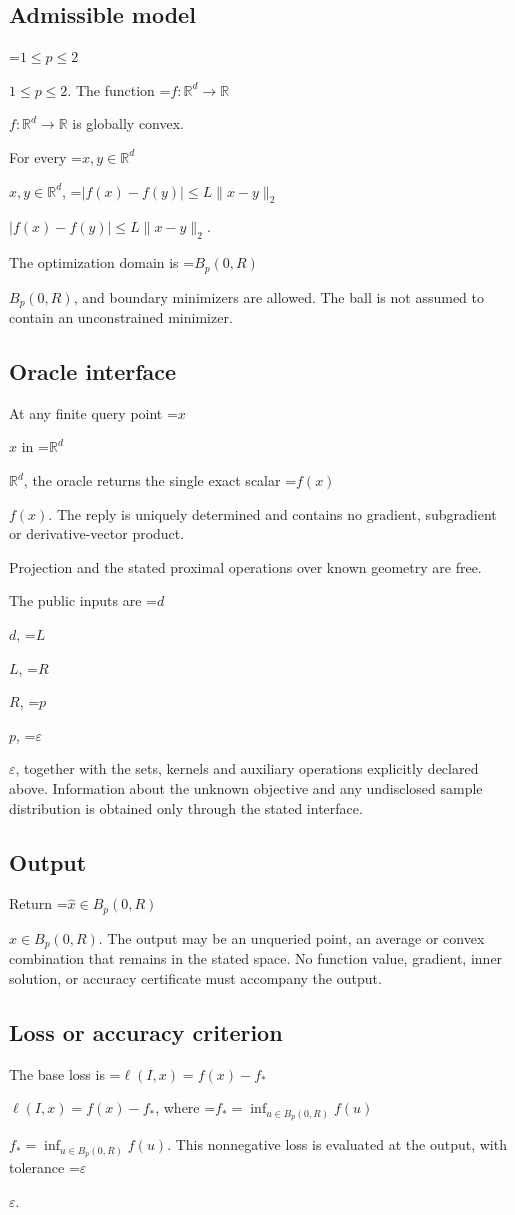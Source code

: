 \documentclass[10pt,a4paper]{article}
\newcommand{\AtlasMath}[1]{\par\begingroup\centering\setbox0=\hbox{$\displaystyle #1$}\ifdim\wd0>1.4\linewidth\typeout{ATLAS WIDE FORMULA: \the\wd0}\fi\ifdim\wd0>\linewidth\resizebox{\linewidth}{!}{\box0}\else\box0\fi\par\endgroup}
\newcommand{\AtlasInlineMath}[1]{\begingroup\setbox0=\hbox{$#1$}\ifdim\wd0>.4\linewidth\endgroup\AtlasMath{#1}\else\endgroup$#1$\fi}
\begin{document}
\subsection{Admissible model}
\AtlasInlineMath{1\le p\le2}. The function \AtlasInlineMath{f:\mathbb{R}^d\to\mathbb{R}} is globally convex.

For every \AtlasInlineMath{x,y\in\mathbb{R}^d}, \AtlasInlineMath{|f(x)-f(y)|\le L\|x-y\|_2}.

The optimization domain is \AtlasInlineMath{B_p(0,R)}, and boundary minimizers are allowed. The ball is not assumed to contain an unconstrained minimizer.

\subsection{Oracle interface}
At any finite query point \AtlasInlineMath{x} in \AtlasInlineMath{\mathbb{R}^d}, the oracle returns the single exact scalar \AtlasInlineMath{f(x)}. The reply is uniquely determined and contains no gradient, subgradient or derivative-vector product.

Projection and the stated proximal operations over known geometry are free.

The public inputs are \AtlasInlineMath{d}, \AtlasInlineMath{L}, \AtlasInlineMath{R}, \AtlasInlineMath{p}, \AtlasInlineMath{\varepsilon}, together with the sets, kernels and auxiliary operations explicitly declared above. Information about the unknown objective and any undisclosed sample distribution is obtained only through the stated interface.

\subsection{Output}
Return \AtlasInlineMath{\widehat{x}\in B_p(0,R)}. The output may be an unqueried point, an average or convex combination that remains in the stated space. No function value, gradient, inner solution, or accuracy certificate must accompany the output.

\subsection{Loss or accuracy criterion}
The base loss is \AtlasInlineMath{\ell(I,x)=f(x)-f_*}, where \AtlasInlineMath{f_*=\inf_{u\in B_p(0,R)}f(u)}. This nonnegative loss is evaluated at the output, with tolerance \AtlasInlineMath{\varepsilon}.
\end{document}
